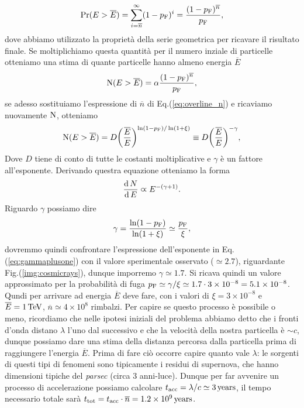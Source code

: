 \begin{equation*}
    \Pr (E > \overline{E}) = \sum_{i = \overline{n}} ^{\infty} (1 - p_\textup{F})^i = \frac{(1 - p_\textup{F})^{\overline{n}}}{p_\textup{F}},
\end{equation*}
dove abbiamo utilizzato la proprietà della serie geometrica per ricavare il risultato finale. Se moltiplichiamo questa quantità per il numero inziale di particelle otteniamo una stima di quante particelle hanno almeno energia $\overline{E}$
\begin{equation*}
    \textup{N} (E > \overline{E}) = \alpha \frac{(1 - p_\textup{F})^{\overline{n}}}{p_\textup{F}},
\end{equation*}
se adesso sostituiamo l'espressione di $\overline{n}$ di Eq.(\ref{eq:overline_n}) e ricaviamo nuovamente $\textup{N}$, otteniamo
\begin{equation*}
    \textup{N} (E > \overline{E}) = D \biggl(\frac{\overline{E}}{E}\biggr)^{\ln(1 - p_\textup{F}) / \ln (1 + \xi)} \equiv D \biggl(\frac{\overline{E}}{E}\biggr) ^ {-\gamma},
\end{equation*}
Dove $D$ tiene di conto di tutte le costanti moltiplicative e $\gamma$ è un fattore all'esponente. Derivando questra equazione otteniamo la forma 
\begin{equation}
    \frac{\operatorname{d} N}{\operatorname{d} E} \varpropto E^{- (\gamma + 1)}.\label{eq:gammaplusone}
\end{equation}
Riguardo $\gamma$ possiamo dire
\begin{equation*}
    \gamma = \frac{\ln(1 - p_\textup{F})}{\ln ( 1 + \xi)} \simeq \frac{p_\textup{F}}{\xi},
\end{equation*}
dovremmo quindi confrontare l'espressione dell'esponente in Eq.(\ref{eq:gammaplusone}) con il valore sperimentale osservato ($\simeq 2.7$), riguardante Fig.(\ref{img:cosmicrays}), dunque imporremo $\gamma \simeq 1.7$. Si ricava quindi un valore approssimato per la probabilità di fuga $p_\textup{F} \simeq \gamma / \xi \simeq 1.7 \cdot 3 \times 10^{-8} = 5.1 \times 10^{-8}$. Qundi per arrivare ad energia $\overline{E}$ deve fare, con i valori di $\xi = 3 \times 10^{-8}$ e $\overline{E} = 1\,\textup{TeV}$, $\overline{n} \simeq 4 \times 10^{8}$ rimbalzi. Per capire se questo processo è possibile o meno, ricordiamo che nelle ipotesi iniziali del problema abbiamo detto che i fronti d'onda distano $\lambda$ l'uno dal successivo e che la velocità della nostra particella è $\sim c$, dunque possiamo dare una stima della distanza percorsa dalla particella prima di raggiungere l'energia $\overline{E}$. Prima di fare ciò occorre capire quanto vale $\lambda$: le sorgenti di questi tipi di fenomeni sono tipicamente i residui di supernova, che hanno dimensioni tipiche del \emph{parsec} (circa $3$ anni-luce). Dunque per far avvenire un processo di accelerazione possiamo calcolare $t_\textup{acc} = \lambda / c \simeq 3\,\textup{years}$, il tempo necessario totale sarà $t_\textup{tot} = t_\textup{acc} \cdot \overline{n} = 1.2\times10^{9}\,\textup{years}$.
